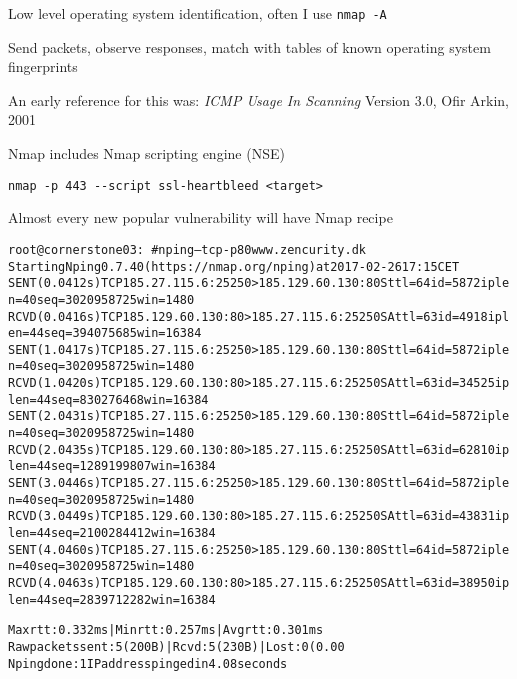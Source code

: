 \documentclass[Screen16to9,17pt]{foils}
\begin{document}
\begin{list2}
\item Low level operating system identification, often I use \verb+nmap -A+
\item Send packets, observe responses, match with tables of known operating system fingerprints
\item An early reference for this was: \emph{ICMP Usage In Scanning} Version 3.0,
  Ofir Arkin, 2001 %
\end{list2}


Nmap includes Nmap scripting engine (NSE)


\begin{list1}
\item \verb+nmap -p 443 --script ssl-heartbleed <target>+\\
\item Almost every new popular vulnerability will have Nmap recipe
\end{list1}


\begin{alltt}\footnotesize
root@cornerstone03:~# nping --tcp -p80 www.zencurity.dk
Starting Nping 0.7.40 ( https://nmap.org/nping ) at 2017-02-26 17:15 CET
SENT (0.0412s) TCP 185.27.115.6:25250 > 185.129.60.130:80 S ttl=64 id=5872 iplen=40  seq=3020958725 win=1480
RCVD (0.0416s) TCP 185.129.60.130:80 > 185.27.115.6:25250 SA ttl=63 id=4918 iplen=44  seq=394075685 win=16384
SENT (1.0417s) TCP 185.27.115.6:25250 > 185.129.60.130:80 S ttl=64 id=5872 iplen=40  seq=3020958725 win=1480
RCVD (1.0420s) TCP 185.129.60.130:80 > 185.27.115.6:25250 SA ttl=63 id=34525 iplen=44  seq=830276468 win=16384
SENT (2.0431s) TCP 185.27.115.6:25250 > 185.129.60.130:80 S ttl=64 id=5872 iplen=40  seq=3020958725 win=1480
RCVD (2.0435s) TCP 185.129.60.130:80 > 185.27.115.6:25250 SA ttl=63 id=62810 iplen=44  seq=1289199807 win=16384
SENT (3.0446s) TCP 185.27.115.6:25250 > 185.129.60.130:80 S ttl=64 id=5872 iplen=40  seq=3020958725 win=1480
RCVD (3.0449s) TCP 185.129.60.130:80 > 185.27.115.6:25250 SA ttl=63 id=43831 iplen=44  seq=2100284412 win=16384
SENT (4.0460s) TCP 185.27.115.6:25250 > 185.129.60.130:80 S ttl=64 id=5872 iplen=40  seq=3020958725 win=1480
RCVD (4.0463s) TCP 185.129.60.130:80 > 185.27.115.6:25250 SA ttl=63 id=38950 iplen=44  seq=2839712282 win=16384

Max rtt: 0.332ms | Min rtt: 0.257ms | Avg rtt: 0.301ms
Raw packets sent: 5 (200B) | Rcvd: 5 (230B) | Lost: 0 (0.00%)
Nping done: 1 IP address pinged in 4.08 seconds
\end{alltt}
\end{document}

